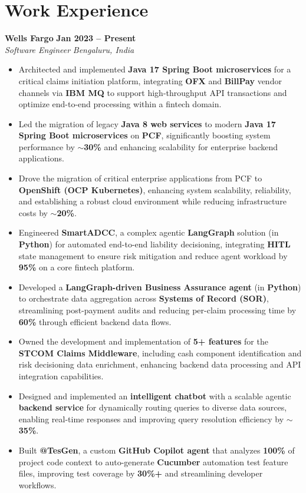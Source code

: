 \documentclass[10pt,a4paper,sans]{moderncv}
\begin{document}
\section{Work Experience}

\noindent
\textbf{Wells Fargo} \hfill \textbf{Jan 2023 -- Present} \\
\textit{Software Engineer} \hfill \textit{Bengaluru, India}
\begin{itemize}
    \item Architected and implemented \textbf{Java 17 Spring Boot microservices} for a critical claims initiation platform, integrating \textbf{OFX} and \textbf{BillPay} vendor channels via \textbf{IBM MQ} to support high-throughput API transactions and optimize end-to-end processing within a fintech domain.
    \item Led the migration of legacy \textbf{Java 8 web services} to modern \textbf{Java 17 Spring Boot microservices} on \textbf{PCF}, significantly boosting system performance by \textbf{$\sim$30\%} and enhancing scalability for enterprise backend applications.
    \item Drove the migration of critical enterprise applications from PCF to \textbf{OpenShift (OCP Kubernetes)}, enhancing system scalability, reliability, and establishing a robust cloud environment while reducing infrastructure costs by \textbf{$\sim$20\%}.
    \item Engineered \textbf{SmartADCC}, a complex agentic \textbf{LangGraph} solution (in \textbf{Python}) for automated end-to-end liability decisioning, integrating \textbf{HITL} state management to ensure risk mitigation and reduce agent workload by \textbf{95\%} on a core fintech platform.
    \item Developed a \textbf{LangGraph-driven Business Assurance agent} (in \textbf{Python}) to orchestrate data aggregation across \textbf{Systems of Record (SOR)}, streamlining post-payment audits and reducing per-claim processing time by \textbf{60\%} through efficient backend data flows.
    \item Owned the development and implementation of \textbf{5+ features} for the \textbf{STCOM Claims Middleware}, including cash component identification and risk decisioning data enrichment, enhancing backend data processing and API integration capabilities.
    \item Designed and implemented an \textbf{intelligent chatbot} with a scalable agentic \textbf{backend service} for dynamically routing queries to diverse data sources, enabling real-time responses and improving query resolution efficiency by \textbf{$\sim$35\%}.
    \item Built \textbf{@TesGen}, a custom \textbf{GitHub Copilot agent} that analyzes \textbf{100\%} of project code context to auto-generate \textbf{Cucumber} automation test feature files, improving test coverage by \textbf{30\%+} and streamlining developer workflows.
\end{itemize}
\end{document}
